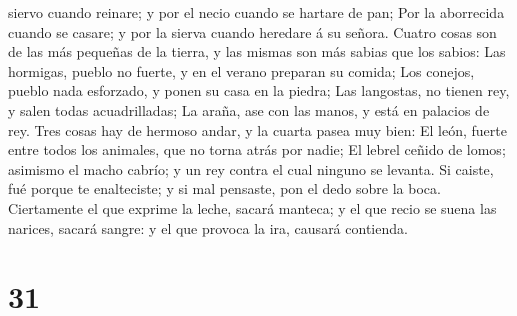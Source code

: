 siervo cuando reinare; y por el necio cuando se hartare de pan;
 Por la aborrecida cuando se casare; y por la sierva
cuando heredare á su señora.  Cuatro cosas son de las más
pequeñas de la tierra, y las mismas son más sabias que los sabios:
 Las hormigas, pueblo no fuerte, y en el verano preparan
su comida;  Los conejos, pueblo nada esforzado, y ponen
su casa en la piedra;  Las langostas, no tienen rey, y
salen todas acuadrilladas;  La araña, ase con las manos,
y está en palacios de rey.  Tres cosas hay de hermoso
andar, y la cuarta pasea muy bien:  El león, fuerte entre
todos los animales, que no torna atrás por nadie;  El
lebrel ceñido de lomos; asimismo el macho cabrío; y un rey contra el
cual ninguno se levanta.  Si caiste, fué porque te
enalteciste; y si mal pensaste, pon el dedo sobre la boca.
 Ciertamente el que exprime la leche, sacará manteca; y
el que recio se suena las narices, sacará sangre: y el que provoca la
ira, causará contienda.

\hypertarget{section-30}{%
\section{31}\label{section-30}}

